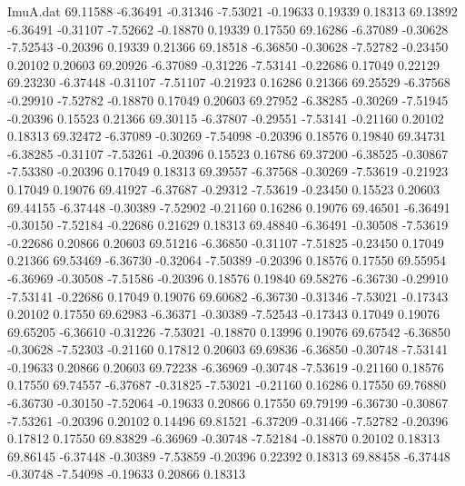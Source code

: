 \begin{filecontents}{ImuA.dat}
  69.11588   -6.36491   -0.31346   -7.53021   -0.19633    0.19339    0.18313
  69.13892   -6.36491   -0.31107   -7.52662   -0.18870    0.19339    0.17550
  69.16286   -6.37089   -0.30628   -7.52543   -0.20396    0.19339    0.21366
  69.18518   -6.36850   -0.30628   -7.52782   -0.23450    0.20102    0.20603
  69.20926   -6.37089   -0.31226   -7.53141   -0.22686    0.17049    0.22129
  69.23230   -6.37448   -0.31107   -7.51107   -0.21923    0.16286    0.21366
  69.25529   -6.37568   -0.29910   -7.52782   -0.18870    0.17049    0.20603
  69.27952   -6.38285   -0.30269   -7.51945   -0.20396    0.15523    0.21366
  69.30115   -6.37807   -0.29551   -7.53141   -0.21160    0.20102    0.18313
  69.32472   -6.37089   -0.30269   -7.54098   -0.20396    0.18576    0.19840
  69.34731   -6.38285   -0.31107   -7.53261   -0.20396    0.15523    0.16786
  69.37200   -6.38525   -0.30867   -7.53380   -0.20396    0.17049    0.18313
  69.39557   -6.37568   -0.30269   -7.53619   -0.21923    0.17049    0.19076
  69.41927   -6.37687   -0.29312   -7.53619   -0.23450    0.15523    0.20603
  69.44155   -6.37448   -0.30389   -7.52902   -0.21160    0.16286    0.19076
  69.46501   -6.36491   -0.30150   -7.52184   -0.22686    0.21629    0.18313
  69.48840   -6.36491   -0.30508   -7.53619   -0.22686    0.20866    0.20603
  69.51216   -6.36850   -0.31107   -7.51825   -0.23450    0.17049    0.21366
  69.53469   -6.36730   -0.32064   -7.50389   -0.20396    0.18576    0.17550
  69.55954   -6.36969   -0.30508   -7.51586   -0.20396    0.18576    0.19840
  69.58276   -6.36730   -0.29910   -7.53141   -0.22686    0.17049    0.19076
  69.60682   -6.36730   -0.31346   -7.53021   -0.17343    0.20102    0.17550
  69.62983   -6.36371   -0.30389   -7.52543   -0.17343    0.17049    0.19076
  69.65205   -6.36610   -0.31226   -7.53021   -0.18870    0.13996    0.19076
  69.67542   -6.36850   -0.30628   -7.52303   -0.21160    0.17812    0.20603
  69.69836   -6.36850   -0.30748   -7.53141   -0.19633    0.20866    0.20603
  69.72238   -6.36969   -0.30748   -7.53619   -0.21160    0.18576    0.17550
  69.74557   -6.37687   -0.31825   -7.53021   -0.21160    0.16286    0.17550
  69.76880   -6.36730   -0.30150   -7.52064   -0.19633    0.20866    0.17550
  69.79199   -6.36730   -0.30867   -7.53261   -0.20396    0.20102    0.14496
  69.81521   -6.37209   -0.31466   -7.52782   -0.20396    0.17812    0.17550
  69.83829   -6.36969   -0.30748   -7.52184   -0.18870    0.20102    0.18313
  69.86145   -6.37448   -0.30389   -7.53859   -0.20396    0.22392    0.18313
  69.88458   -6.37448   -0.30748   -7.54098   -0.19633    0.20866    0.18313

\end{filecontents}

